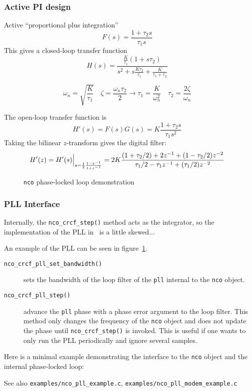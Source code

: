 \subsubsection{Active PI design}
Active ``proportional plus integration''
\[
    F(s) = \frac{1 + \tau_2 s}{\tau_1 s}
\]
This gives a closed-loop transfer function
\[
    H(s) = \frac{
                \frac{K}{\tau_1} (1 + s\tau_2)
           } {
                s^2 + s\frac{K\tau_2}{\tau_1} + \frac{K}{\tau_1 + \tau_2}
           }
\]

\[
    \omega_n = \sqrt{\frac{K}{\tau_1}}
    \,\,\,\,\,\,
    \zeta = \frac{\omega_n \tau_2}{2}
        \rightarrow
    \tau_1 = \frac{K}{\omega_n^2}
    \,\,\,\,\,\,
    \tau_2 = \frac{2\zeta}{\omega_n}
\]

The open-loop transfer function is
\[
    H'(s) = F(s)G(s) = K \frac{1 + \tau_2 s}{\tau_1 s^2}
\]
Taking the bilinear $z$-transform gives the digital filter:
\[
    H'(z) = H'(s)\Bigl.\Bigr|_{s = \frac{1}{2}\frac{1-z^{-1}}{1+z^{-1}}}
          = 2 K \frac{
                (1+\tau_2/2) + 2 z^{-1}     + ( 1 - \tau_2/2)z^{-2}
          } {
                \tau_1/2 -\tau_1 z^{-1} + (\tau_1/2)z^{-2}
          }
\]

\begin{figure}
\centering
{}
\caption{{\tt nco} phase-locked loop demonstration}
\label{fig:module:nco:pll}
\end{figure}

\subsubsection{PLL Interface}

Internally, the {\tt nco\_crcf\_step()} method acts as the integrator, so the
implementation of the PLL in \liquid\ is a little skewed...

An example of the PLL can be seen in figure~\ref{fig:module:nco:pll}.

\begin{description}
\item[{\tt nco\_crcf\_pll\_set\_bandwidth()}]
    sets the bandwidth of the loop filter of the {\tt pll} internal to the
    {\tt nco} object.
\item[{\tt nco\_crcf\_pll\_step()}]
    advance the {\tt pll} phase with a phase error argument to the loop
    filter.
    This method only changes the frequency of the {\tt nco} object and does
    not update the phase until {\tt nco\_crcf\_step()} is invoked.
    This is useful if one wants to only run the PLL periodically and ignore
    several samples.
\end{description}

Here is a minimal example demonstrating the interface to the {\tt nco} object
and the internal phase-locked loop:


See also
{\tt examples/nco\_pll\_example.c},
{\tt examples/nco\_pll\_modem\_example.c}

